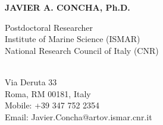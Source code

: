 \documentclass[11pt]{res}
\begin{document}
 
{\centering \Large \bf JAVIER A. CONCHA, Ph.D.\par} %
\vspace{0.3in}                                         
\begin{multicols}{2}
{\raggedright Postdoctoral Researcher\\ Institute of Marine Science (ISMAR)\\ National Research Council of Italy (CNR)\\ ~~~~~~~~~~~~~~~~~~~~~~~~~~~~~~~~~~~\\}
{\raggedleft Via Deruta 33\\Roma, RM 00181, Italy\\Mobile: +39 347 752 2354\\Email: Javier.Concha@artov.ismar.cnr.it\\}
\end{multicols}
\vspace{-0.4in} 
\hrulefill
\end{document}
